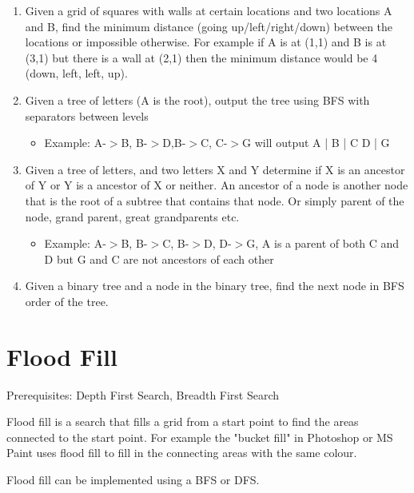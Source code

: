 \documentclass[11pt,oneside]{book}
\begin{document}
\begin{enumerate}
\item Given a grid of squares with walls at certain locations and two locations A and B, find the minimum distance (going up/left/right/down) between the locations or impossible otherwise. For example if A is at (1,1) and B is at (3,1) but there is a wall at (2,1) then the minimum distance would be 4 (down, left, left, up). 
\item Given a tree of letters (A is the root), output the tree using BFS with separators between levels

\begin{itemize}
\item Example: A-$>$B, B-$>$D,B-$>$C, C-$>$G will output A | B | C D | G 
\end{itemize}
\item Given a tree of letters, and two letters X and Y determine if X is an ancestor of Y or Y is a ancestor of X or neither. An ancestor of a node is another node that is the root of a subtree that contains that node. Or simply parent of the node, grand parent, great grandparents etc.

\begin{itemize}
\item Example: A-$>$B, B-$>$C, B-$>$D, D-$>$G,  A is a parent of both C and D but G and C are not ancestors of each other
\end{itemize}
\item Given a binary tree and a node in the binary tree, find the next node in BFS order of the tree.
\end{enumerate}

        \section{ Flood Fill }
        

Prerequisites: Depth First Search, Breadth First Search

Flood fill is a search that fills a grid from a start point to find the areas connected to the start point. For example the "bucket fill" in Photoshop or MS Paint uses flood fill to fill in the connecting areas with the same colour.

Flood fill can be implemented using a BFS or DFS.
\end{document}
